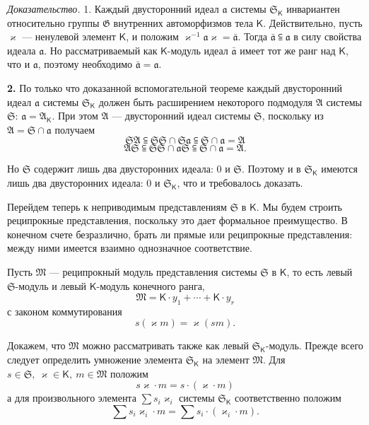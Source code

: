 \documentclass[11pt]{article}
\begin{document}
\emph{Доказательство.} 1. Каждый двусторонний идеал \(\mathfrak a\) системы \(\mathfrak S_{\mathsf K}\) инвариантен относительно группы \(\mathfrak G\) внутренних автоморфизмов тела \(\mathsf K\). Действительно, пусть \(\varkappa\) --- ненулевой элемент \(\mathsf K\), и положим \(\varkappa^{-1}\mathfrak a\varkappa=\bar{\mathfrak a}\). Тогда \(\bar{\mathfrak a}\subseteqq\mathfrak a\) в силу свойства идеала \(\mathfrak a\). Но рассматриваемый как \(\mathsf K\)-модуль идеал \(\bar{\mathfrak a}\) имеет тот же ранг над \(\mathsf K\), что и \(\mathfrak a\), поэтому необходимо \(\bar{\mathfrak a}=\mathfrak a\).

\textbf{2.} По только что доказанной вспомогательной теореме каждый двусторонний идеал \(\mathfrak a\) системы \(\mathfrak S_{\mathsf K}\) должен быть расширением некоторого подмодуля \(\mathfrak A\) системы \(\mathfrak S\): \(\mathfrak a=\mathfrak A_{\mathsf K}\). При этом \(\mathfrak A\) --- двусторонний идеал системы \(\mathfrak S\), поскольку из \(\mathfrak A=\mathfrak S\cap\mathfrak a\) получаем
\[
\mathfrak S\mathfrak A\subseteqq\mathfrak S\mathfrak S\cap\mathfrak S\mathfrak a\subseteqq\mathfrak S\cap\mathfrak a=\mathfrak A
\]
\[
\mathfrak A\mathfrak S\subseteqq\mathfrak S\mathfrak S\cap\mathfrak a\mathfrak S\subseteqq\mathfrak S\cap\mathfrak a=\mathfrak A.
\]

Но \(\mathfrak S\) содержит лишь два двусторонних идеала: 0 и \(\mathfrak S\). Поэтому и в \(\mathfrak S_{\mathsf K}\) имеются лишь два двусторонних идеала: 0 и \(\mathfrak S_{\mathsf K}\), что и требовалось доказать.

Перейдем теперь к неприводимым представлениям \(\mathfrak S\) в \(\mathsf K\). Мы будем строить реципрокные представления, поскольку это дает формальное преимущество. В конечном счете безразлично, брать ли прямые или реципрокные представления: между ними имеется взаимно однозначное соответствие.

Пусть \(\mathfrak M\) --- реципрокный модуль представления системы \(\mathfrak S\) в \(\mathsf K\), то есть левый \(\mathfrak S\)-модуль и левый \(\mathsf K\)-модуль конечного ранга,
\[
\mathfrak M=\mathsf K\cdot y_1+\cdots+\mathsf K\cdot y_r
\]
с законом коммутирования
\[
s(\varkappa m)=\varkappa (sm).
\]

Докажем, что \(\mathfrak M\) можно рассматривать также как левый \(\mathfrak S_{\mathsf K}\)-модуль. Прежде всего следует определить умножение элемента \(\mathfrak S_{\mathsf K}\) на элемент \(\mathfrak M\). Для \(s\in\mathfrak S,\ \varkappa \in\mathsf K,\ m\in\mathfrak M\) положим
\[
s\varkappa \cdot m=s\cdot(\varkappa \cdot m)
\]
а для произвольного элемента \(\sum s_i\varkappa _i\) системы \(\mathfrak S_{\mathsf K}\) соответственно положим
\[
\sum s_i\varkappa _i\cdot m=\sum s_i\cdot(\varkappa _i\cdot m).
\]
\end{document}

